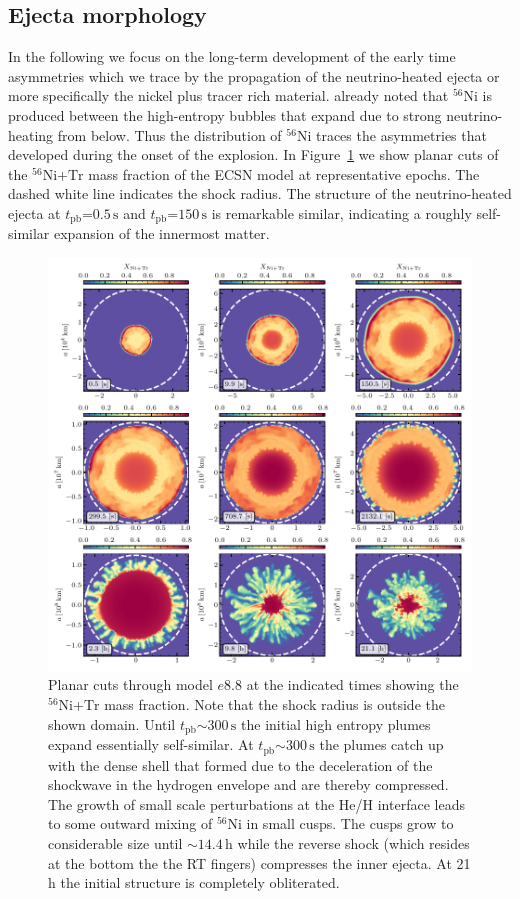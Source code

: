 \documentclass[fleqn,usenatbib]{mnras}
\newcommand{\tpb}{\ensuremath{t_{\text{pb}}}}
\newcommand{\nickel}{\ensuremath{\mathrm{^{56}Ni}}\xspace}
\newcommand{\tracer}{\ensuremath{\mathrm{Tr}}\xspace}
\newcommand{\s}{\ensuremath{\text{s}}}
\begin{document}
\subsection{Ejecta morphology}
In the following we focus on the long-term development of the early time asymmetries which we trace by the propagation of the neutrino-heated ejecta or more specifically the nickel plus tracer rich material. \cite{Kifonidis2003} already noted that \nickel is produced between the high-entropy bubbles that expand due to strong neutrino-heating from below. Thus the distribution of \nickel traces the asymmetries that developed during the onset of the explosion. 
In Figure~\ref{fig:e8 3d 4times} we show planar cuts of the $\nickel\mathord{+}\tracer$ mass fraction of the ECSN model at representative epochs. The dashed white line indicates the shock radius.
The structure of the neutrino-heated ejecta at $\tpb\mathord{=}0.5\,\s$ and $\tpb\mathord{=}150\,\s$ is remarkable similar, indicating a roughly self-similar expansion of the innermost matter.

\begin{figure}%
 \centering
 \includegraphics[width=\textwidth,trim=0.2cm 0cm 0cm 0cm,clip]{pic/e8_3d_3x3_NiX.pdf} 
 \caption{Planar cuts through model $e8.8$ at the indicated times showing the \nickel+\tracer mass fraction. Note that the shock radius is outside the shown domain. Until $\tpb\mathord{\sim} 300\,\s$ the initial high entropy plumes expand essentially self-similar. At $\tpb\mathord{\sim} 300\,\s$ the plumes catch up with the dense shell that formed due to the deceleration of the shockwave in the hydrogen envelope and are thereby compressed. The growth of small scale perturbations at the He/H interface leads to some outward mixing of \nickel in small cusps. The cusps grow to considerable size until $\mathord{\sim}14.4\,\mathrm{h}$ while the reverse shock (which resides at the bottom the the RT fingers) compresses the inner ejecta. At 21 h the initial structure is completely obliterated.}
 \label{fig:e8 3d 4times}
\end{figure}
\end{document}
